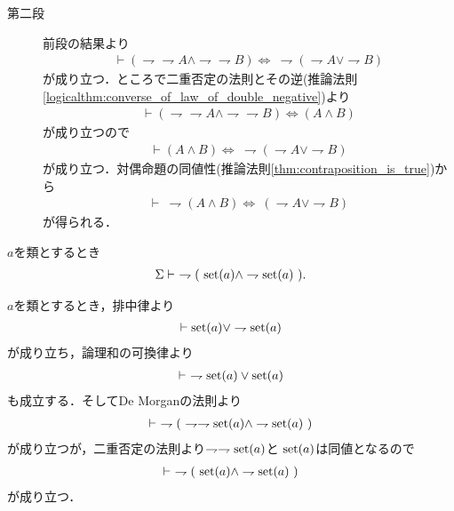 \begin{prf}
\begin{description}
			\item[第二段]
				前段の結果より
				\begin{align}
					\vdash (\rightharpoondown \rightharpoondown A \wedge \rightharpoondown \rightharpoondown B)
					\Longleftrightarrow\ \rightharpoondown (\rightharpoondown A \vee \rightharpoondown B)
				\end{align}
				が成り立つ．ところで二重否定の法則とその逆(推論法則\ref{logicalthm:converse_of_law_of_double_negative})より
				\begin{align}
					\vdash (\rightharpoondown \rightharpoondown A \wedge \rightharpoondown \rightharpoondown B)
					\Longleftrightarrow (A \wedge B)
				\end{align}
				が成り立つので
				\begin{align}
					\vdash (A \wedge B) 
					\Longleftrightarrow\ \rightharpoondown (\rightharpoondown A \vee \rightharpoondown B)
				\end{align}
				が成り立つ．対偶命題の同値性(推論法則\ref{thm:contraposition_is_true})から
				\begin{align}
					\vdash\ \rightharpoondown (A \wedge B)
					\Longleftrightarrow\ (\rightharpoondown A \vee \rightharpoondown B)
				\end{align}
				が得られる．
				\QED
		\end{description}
	\end{prf}
	
	
	\begin{screen}
		\begin{thm}[集合であり真類でもある類は存在しない]
			$a$を類とするとき
			\begin{align}
				\Sigma \vdash\ \rightharpoondown (\ \operatorname*{set} (a) \wedge \rightharpoondown \operatorname*{set} (a)\ ).
			\end{align}
		\end{thm}
	\end{screen}
	
	\begin{prf}
		$a$を類とするとき，排中律より
		\begin{align}
			\vdash \operatorname*{set} (a) \vee \rightharpoondown \operatorname*{set} (a)
		\end{align}
		が成り立ち，論理和の可換律より
		\begin{align}
			\vdash\ \rightharpoondown \operatorname*{set} (a) \vee \operatorname*{set} (a)
		\end{align}
		も成立する．そしてDe Morganの法則より
		\begin{align}
			\vdash\ \rightharpoondown (\ \rightharpoondown \rightharpoondown \operatorname*{set} (a) \wedge \rightharpoondown \operatorname*{set} (a)\ )
		\end{align}
		が成り立つが，二重否定の法則より$\rightharpoondown \rightharpoondown \operatorname*{set} (a)$と
		$\operatorname*{set} (a)$は同値となるので
		\begin{align}
			\vdash\ \rightharpoondown (\ \operatorname*{set} (a) \wedge \rightharpoondown \operatorname*{set} (a)\ )
		\end{align}
		が成り立つ．
		\QED
	\end{prf}
	
